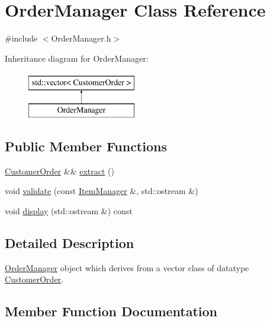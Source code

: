 \hypertarget{classOrderManager}{}\section{Order\+Manager Class Reference}
\label{classOrderManager}


{\ttfamily \#include $<$Order\+Manager.\+h$>$}

Inheritance diagram for Order\+Manager\+:\begin{figure}[H]
\begin{center}
\leavevmode
\includegraphics[height=2.000000cm]{classOrderManager}
\end{center}
\end{figure}
\subsection*{Public Member Functions}
\begin{DoxyCompactItemize}
\item 
\mbox{\hyperlink{classCustomerOrder}{Customer\+Order}} \&\& \mbox{\hyperlink{classOrderManager_a2111b67d23078421bb0c012c25ee87f1}{extract}} ()
\item 
void \mbox{\hyperlink{classOrderManager_a5469cae831246813134630f8bd85db79}{validate}} (const \mbox{\hyperlink{classItemManager}{Item\+Manager}} \&, std\+::ostream \&)
\item 
void \mbox{\hyperlink{classOrderManager_a01ff4be0afbb0535de41d5caedcf0016}{display}} (std\+::ostream \&) const
\end{DoxyCompactItemize}


\subsection{Detailed Description}
\mbox{\hyperlink{classOrderManager}{Order\+Manager}} object which derives from a vector class of datatype \mbox{\hyperlink{classCustomerOrder}{Customer\+Order}}. 

\subsection{Member Function Documentation}
\mbox{\label{classOrderManager_a01ff4be0afbb0535de41d5caedcf0016}} 
